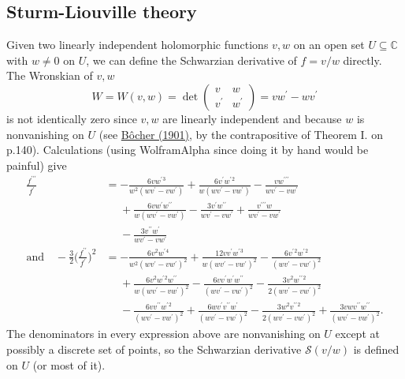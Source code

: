 \documentclass[11pt,leqno]{article}
\theoremstyle{plain}
\theoremstyle{definition}
\numberwithin{equation}{section}
\numberwithin{lem}{section}
\begin{document}
\subsection{Sturm-Liouville theory}
Given two linearly independent holomorphic functions $v,w$ on an open set $U\subseteq \mathbb C$ with $w\neq 0$ on $U$, we can define the Schwarzian derivative of $f = v/w$ directly. The Wronskian of $v,w$
\[W = W(v,w) = \det\begin{pmatrix}
    v & w \\ v^\prime & w^\prime
\end{pmatrix} = vw^\prime - wv^\prime\]
is not identically zero since $v,w$ are linearly independent and because $w$ is nonvanishing on $U$ (see \href{https://www.ams.org/journals/tran/1901-002-02/S0002-9947-1901-1500560-5/S0002-9947-1901-1500560-5.pdf}{B\^ocher (1901)}, by the contrapositive of Theorem I. on p.140). Calculations (using WolframAlpha since doing it by hand would be painful) give
\begin{align*}
    \frac{f^{\prime\prime\prime}}{f^\prime} &= -\frac{6 v{} w^{\prime}{}^3}{w{}^2 (w{} v^{\prime}{} - v{} w^{\prime}{})} + \frac{6 v^{\prime}{} w^{\prime}{}^2}{w{} (w{} v^{\prime}{} - v{} w^{\prime}{})} - \frac{v{} w^{\prime\prime\prime}{}}{w{} v^{\prime}{} - v{} w^{\prime}{}} \\
    &\phantom{=}+ \frac{6 v{} w^{\prime}{} w^{\prime\prime}{}}{w{} (w{} v^{\prime}{} - v{} w^{\prime}{})} - \frac{3 v^{\prime}{} w^{\prime\prime}{}}{w{} v^{\prime}{} - v{} w^{\prime}{}} + \frac{v^{\prime\prime\prime}{} w{}}{w{} v^{\prime}{} - v{} w^{\prime}{}} \\
    &\phantom{=}- \frac{3 v^{\prime\prime}{} w^{\prime}{}}{w{} v^{\prime}{} - v{} w^{\prime}{}} \\
    \text{and}\quad -\frac{3}{2}\biggl(\frac{f^{\prime\prime}}{f^\prime}\biggr)^2 &= -\frac{6 v{}^2 w^{\prime}{}^4}{w{}^2 (w{} v^{\prime}{} - v{} w^{\prime}{})^2} + \frac{12 v{} v^{\prime}{} w^{\prime}{}^3}{w{} (w{} v^{\prime}{} - v{} w^{\prime}{})^2} - \frac{6 v^{\prime}{}^2 w^{\prime}{}^2}{(w{} v^{\prime}{} - v{} w^{\prime}{})^2} \\
    &\phantom{=}+ \frac{6 v{}^2 w^{\prime}{}^2 w^{\prime\prime}{}}{w{} (w{} v^{\prime}{} - v{} w^{\prime}{})^2} - \frac{6 v{} v^{\prime}{} w^{\prime}{} w^{\prime\prime}{}}{(w{} v^{\prime}{} - v{} w^{\prime}{})^2} - \frac{3 v{}^2 w^{\prime\prime}{}^2}{2 (w{} v^{\prime}{} - v{} w^{\prime}{})^2}\\
    &\phantom{=} - \frac{6 v{} v^{\prime\prime}{} w^{\prime}{}^2}{(w{} v^{\prime}{} - v{} w^{\prime}{})^2} + \frac{6 w{} v^{\prime}{} v^{\prime\prime}{} w^{\prime}{}}{(w{} v^{\prime}{} - v{} w^{\prime}{})^2} - \frac{3 w{}^2 v^{\prime\prime}{}^2}{2 (w{} v^{\prime}{} - v{} w^{\prime}{})^2} + \frac{3 v{} w{} v^{\prime\prime}{} w^{\prime\prime}{}}{(w{} v^{\prime}{} - v{} w^{\prime}{})^2}.
\end{align*}
The denominators in every expression above are nonvanishing on $U$ except at possibly a discrete set of points, so the Schwarzian derivative $\mathscr S(v/w)$ is defined on $U$ (or most of it).
\end{document}

